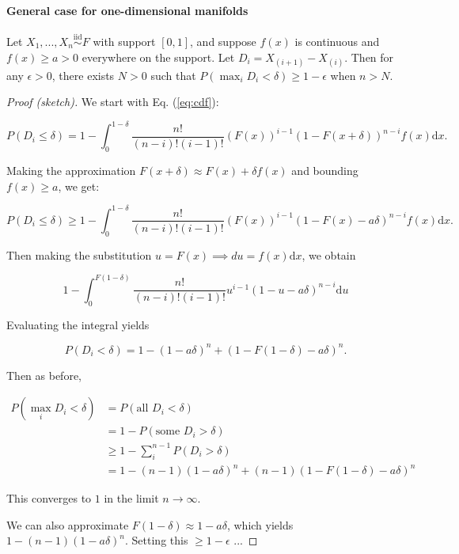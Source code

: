 \documentclass[12pt]{article}
\begin{document}
\hypertarget{general-case-for-one-dimensional-manifolds}{%
\paragraph{General case for one-dimensional
manifolds}\label{general-case-for-one-dimensional-manifolds}}

\begin{theorem}
\label{thm:generalized}
Let $X_1, ..., X_n \stackrel{\mathrm{iid}}{\sim}F$ with support $[0, 1]$, and suppose $f(x)$ is continuous and $f(x) \geq a > 0$ everywhere on the support. 
Let $D_i = X_{(i+1)} - X_{(i)}$. 
Then for any $\epsilon > 0$, there exists $N > 0$ such that $P(\max_i D_i < \delta) \geq 1 - \epsilon$ when $n > N$.
\end{theorem}

\begin{proof}[Proof (sketch)]
We start with Eq. (\ref{eq:cdf}):

$$P(D_i \leq \delta) = 1 - \int_0^{1-\delta} \frac{n!}{(n-i)! (i-1)!} (F(x))^{i-1} (1 - F(x + \delta))^{n-i} f(x) \mathrm{d}x.$$

Making the approximation $F(x+\delta) \approx F(x) + \delta f(x)$ 
and bounding $f(x) \geq a$, we get:

$$P(D_i \leq \delta) \geq 1 - \int_0^{1-\delta} \frac{n!}{(n-i)! (i-1)!} (F(x))^{i-1} (1 - F(x) - a \delta)^{n-i} f(x) \mathrm{d}x.$$

Then making the substitution $u = F(x) \implies du = f(x) \mathrm{d}x$, we obtain 

$$1 - \int_0^{F(1-\delta)} \frac{n!}{(n-i)! (i-1)!} u^{i-1} (1 - u - a \delta)^{n-i} \mathrm{d}u$$

Evaluating the integral yields

$$P(D_i < \delta) = 1 - (1 - a \delta)^n + (1 - F(1-\delta) - a \delta)^n.$$

Then as before,

$$
\begin{aligned}
P(\max_i D_i < \delta) & = P(\text{all } D_i < \delta) \\
& = 1 - P(\text{some } D_i > \delta) \\
& \geq 1 - \sum_i^{n-1} P(D_i > \delta) \\
& = 1 - (n - 1) (1 - a \delta)^n + (n - 1) (1 - F(1 - \delta) - a \delta)^n
\end{aligned}
$$

This converges to $1$ in the limit $n \to \infty$.

We can also approximate $F(1 - \delta) \approx 1 - a \delta$, which yields 
$1 - (n - 1) (1 - a \delta)^n$. Setting this $\geq 1 - \epsilon$ ...
\end{proof}
\end{document}
